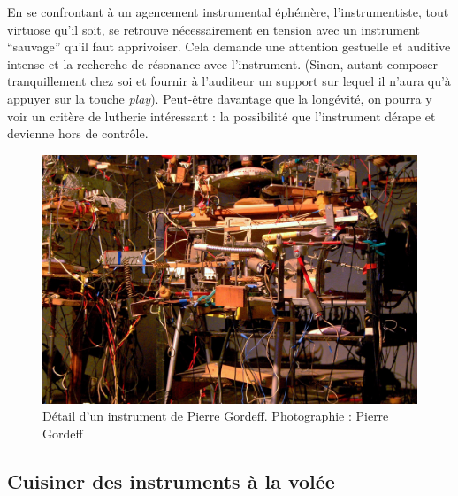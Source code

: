 \indent En se confrontant à un agencement instrumental éphémère, l'instrumentiste, tout virtuose qu'il soit, se retrouve nécessairement en tension avec un instrument ``sauvage'' qu'il faut apprivoiser. Cela demande une attention gestuelle et auditive intense et la recherche de résonance avec l'instrument. (Sinon, autant composer tranquillement chez soi et fournir à l’auditeur un support sur lequel il n’aura qu’à appuyer sur la touche \textit{play}). Peut-être davantage que la longévité, on pourra y voir un critère de lutherie intéressant : la possibilité que l'instrument dérape et devienne hors de contrôle.

\begin{figure}[!htbp]
	\captionsetup{format=plain}%
	\includegraphics[width=\textwidth]{gfx/02_ephemeral/PierreGordeff.jpg}
	\caption{Détail d'un instrument de Pierre Gordeff. Photographie : Pierre Gordeff}
	\label{fig:ephemeral:Gordeff}
\end{figure}

\subsection{Cuisiner des instruments à la volée}

